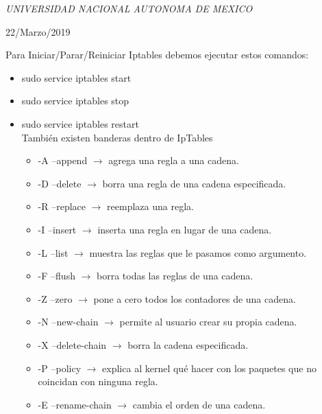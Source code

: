 \documentclass[a4paper, 11pt, oneside]{article}
\begin{document}
\begin{titlepage}
	\textit{UNIVERSIDAD NACIONAL AUTONOMA DE MEXICO} 
	
	\vfill
	
	
	
	
	\vspace{0.3\baselineskip} 
	
	22/Marzo/2019 
	
	 

\end{titlepage}
Para Iniciar/Parar/Reiniciar Iptables debemos ejecutar estos comandos:
\begin{itemize}
    \item sudo service iptables start
    \item sudo service iptables stop
    \item sudo service iptables restart\\
    También existen banderas dentro de IpTables
    \begin{itemize}
        \item -A –append $\rightarrow$ agrega una regla a una cadena.
        \item -D –delete $\rightarrow$ borra una regla de una cadena especificada.
        \item -R –replace $\rightarrow$ reemplaza una regla.
        \item -I –insert $\rightarrow$ inserta una regla en lugar de una cadena.
        \item -L –list $\rightarrow$ muestra las reglas que le pasamos como argumento.
        \item -F –flush $\rightarrow$ borra todas las reglas de una cadena.
        \item -Z –zero $\rightarrow$ pone a cero todos los contadores de una cadena.
        \item -N –new-chain $\rightarrow$ permite al usuario crear su propia cadena.
        \item -X –delete-chain $\rightarrow$ borra la cadena especificada.
        \item -P –policy $\rightarrow$ explica al kernel qué hacer con los paquetes que no coincidan con ninguna regla.
        \item -E –rename-chain $\rightarrow$ cambia el orden de una cadena.

    \end{itemize}
\end{itemize}
\end{document}
